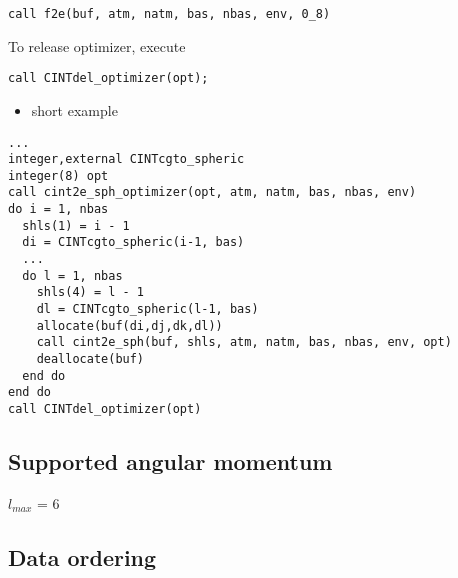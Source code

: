 \documentclass{article}
\begin{document}
\begin{verbatim}
call f2e(buf, atm, natm, bas, nbas, env, 0_8)
\end{verbatim}
To release optimizer, execute

\begin{verbatim}
call CINTdel_optimizer(opt);
\end{verbatim}
\begin{itemize}
\item
  short example
\end{itemize}
\begin{verbatim}
...
integer,external CINTcgto_spheric
integer(8) opt
call cint2e_sph_optimizer(opt, atm, natm, bas, nbas, env)
do i = 1, nbas
  shls(1) = i - 1
  di = CINTcgto_spheric(i-1, bas)
  ...
  do l = 1, nbas
    shls(4) = l - 1
    dl = CINTcgto_spheric(l-1, bas)
    allocate(buf(di,dj,dk,dl))
    call cint2e_sph(buf, shls, atm, natm, bas, nbas, env, opt)
    deallocate(buf)
  end do
end do
call CINTdel_optimizer(opt)
\end{verbatim}
\subsection{Supported angular momentum}

$l_{max}$ = 6

\subsection{Data ordering}
\end{document}
